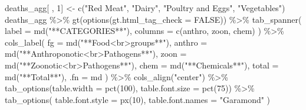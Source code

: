 \documentclass[
  letterpaper,
  DIV=11,
  numbers=noendperiod]{scrartcl}
\newenvironment{Shaded}{\begin{snugshade}}{\end{snugshade}}
\newcommand{\AttributeTok}[1]{\textcolor[rgb]{0.40,0.45,0.13}{#1}}
\newcommand{\ConstantTok}[1]{\textcolor[rgb]{0.56,0.35,0.01}{#1}}
\newcommand{\DecValTok}[1]{\textcolor[rgb]{0.68,0.00,0.00}{#1}}
\newcommand{\FunctionTok}[1]{\textcolor[rgb]{0.28,0.35,0.67}{#1}}
\newcommand{\NormalTok}[1]{\textcolor[rgb]{0.00,0.23,0.31}{#1}}
\newcommand{\OtherTok}[1]{\textcolor[rgb]{0.00,0.23,0.31}{#1}}
\newcommand{\SpecialCharTok}[1]{\textcolor[rgb]{0.37,0.37,0.37}{#1}}
\newcommand{\StringTok}[1]{\textcolor[rgb]{0.13,0.47,0.30}{#1}}
\begin{document}
\begin{Shaded}
\begin{Highlighting}[]
\NormalTok{deaths\_agg[ , }\DecValTok{1}\NormalTok{] }\OtherTok{\textless{}{-}} \FunctionTok{c}\NormalTok{(}\StringTok{"Red Meat"}\NormalTok{, }\StringTok{"Dairy"}\NormalTok{, }\StringTok{"Poultry and Eggs"}\NormalTok{, }\StringTok{"Vegetables"}\NormalTok{)}
\NormalTok{deaths\_agg }\SpecialCharTok{\%\textgreater{}\%}
\FunctionTok{gt}\NormalTok{(}\FunctionTok{options}\NormalTok{(}\AttributeTok{gt.html\_tag\_check =} \ConstantTok{FALSE}\NormalTok{)) }\SpecialCharTok{\%\textgreater{}\%}
  \FunctionTok{tab\_spanner}\NormalTok{(}
    \AttributeTok{label =} \FunctionTok{md}\NormalTok{(}\StringTok{"**CATEGORIES**"}\NormalTok{),}
    \AttributeTok{columns =} \FunctionTok{c}\NormalTok{(anthro, zoon, chem)}
\NormalTok{  ) }\SpecialCharTok{\%\textgreater{}\%} 
  \FunctionTok{cols\_label}\NormalTok{(}
\AttributeTok{fg =} \FunctionTok{md}\NormalTok{(}\StringTok{"**Food\textless{}br\textgreater{}groups**"}\NormalTok{),}
\AttributeTok{anthro =} \FunctionTok{md}\NormalTok{(}\StringTok{"**Anthroponotic\textless{}br\textgreater{}Pathogens**"}\NormalTok{),}
\AttributeTok{zoon =} \FunctionTok{md}\NormalTok{(}\StringTok{"**Zoonotic\textless{}br\textgreater{}Pathogens**"}\NormalTok{),}
\AttributeTok{chem =} \FunctionTok{md}\NormalTok{(}\StringTok{"**Chemicals**"}\NormalTok{),}
\AttributeTok{total =} \FunctionTok{md}\NormalTok{(}\StringTok{"**Total**"}\NormalTok{),}
\AttributeTok{.fn =}\NormalTok{ md}
\NormalTok{) }\SpecialCharTok{\%\textgreater{}\%} 
  \FunctionTok{cols\_align}\NormalTok{(}\StringTok{"center"}\NormalTok{) }\SpecialCharTok{\%\textgreater{}\%} 
\FunctionTok{tab\_options}\NormalTok{(}\AttributeTok{table.width =} \FunctionTok{pct}\NormalTok{(}\DecValTok{100}\NormalTok{), }\AttributeTok{table.font.size =} \FunctionTok{pct}\NormalTok{(}\DecValTok{75}\NormalTok{)) }\SpecialCharTok{\%\textgreater{}\%} 
  \FunctionTok{tab\_options}\NormalTok{(}
    \AttributeTok{table.font.style =} \FunctionTok{px}\NormalTok{(}\DecValTok{10}\NormalTok{),}
    \AttributeTok{table.font.names =} \StringTok{"Garamond"}
\NormalTok{  )}
\end{Highlighting}
\end{Shaded}
\end{document}
